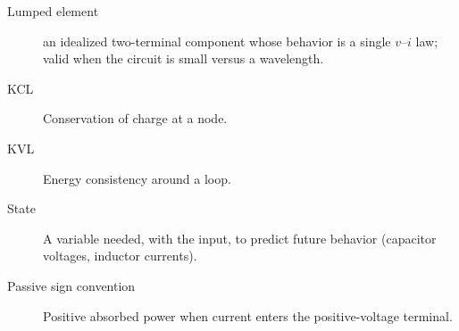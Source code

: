 \medskip
\begin{description}
\item[Lumped element] an idealized two-terminal component whose behavior is a
single \(v\)--\(i\) law; valid when the circuit is small versus a wavelength.
\item[KCL] Conservation of charge at a node.
\item[KVL] Energy consistency around a loop.
\item[State] A variable needed, with the input, to predict future behavior
(capacitor voltages, inductor currents).
\item[Passive sign convention] Positive absorbed power when current enters the
positive-voltage terminal.
\end{description}
